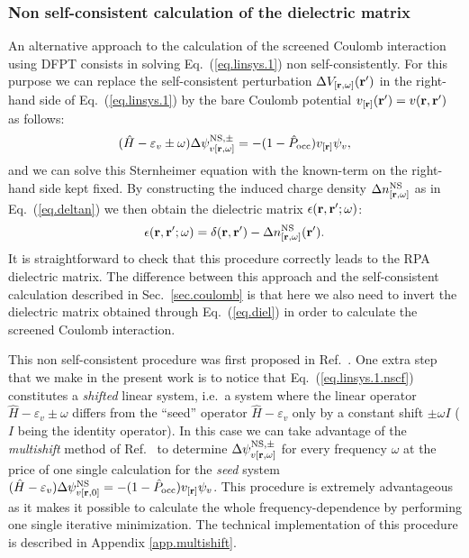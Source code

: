 \documentclass[twocolumn,prb,showpacs,superscriptaddress]{revtex4}
\def\w{\omega}
\def\H{\hat{H}}
\def\P{\hat{P}_{\rm occ}}
\def\E{\varepsilon}
\def\r{{\bf r}}
\def\rp{{\bf r^\prime}}
\begin{document}
\subsubsection{Non self-consistent calculation of the dielectric matrix}\label{sec.diel.nscf}

An alternative approach to the calculation of the screened Coulomb interaction
using DFPT consists in solving Eq.\ (\ref{eq.linsys.1}) non self-consistently.
For this purpose we can replace the self-consistent perturbation $\Delta V_{[\r,\w]}(\rp)$
in the right-hand side of Eq.\ (\ref{eq.linsys.1}) by the bare Coulomb potential
$v_{[\r]}(\rp)=v(\r,\rp)$ as follows:
  \begin{equation}\label{eq.linsys.1.nscf}
  (\H-\E_v\pm\w) \Delta \psi^{{\rm NS},\pm}_{v[\r,\w]}  = -(1-\P)  v_{[\r]} \psi_v, 
  \end{equation}
and we can solve this Sternheimer equation with the known-term on the right-hand side
kept fixed. By constructing the induced charge density $\Delta n^{\rm NS}_{[\r,\w]}$ as in Eq.\ (\ref{eq.deltan})
we then obtain the dielectric matrix $\epsilon(\r,\rp;\w)$:
  \begin{equation}\label{eq.diel}
  \epsilon(\r,\rp;\w) = \delta(\r,\rp) - \Delta n^{\rm NS}_{[\r,\w]}(\rp).
  \end{equation}
It is straightforward to check that this procedure correctly leads to the RPA
dielectric matrix.\cite{hl86-prb}
The difference between this approach and the self-consistent calculation described in
Sec.\ \ref{sec.coulomb} is that here we also need to invert the dielectric matrix obtained
through Eq.\ (\ref{eq.diel}) in order to calculate the screened Coulomb interaction.

This non self-consistent procedure was first proposed in Ref.\ .
One extra step that we make in the present work is to notice that Eq.\ (\ref{eq.linsys.1.nscf})
constitutes a {\it shifted} linear system, i.e.\ a system where the linear operator
$\H-\E_v\pm\w$ differs from the ``seed'' operator $\H-\E_v$ only by a constant shift $\pm\w I$ 
($I$ being the identity operator). 
In this case we can take
advantage of the {\it multishift} method of Ref.\ 
to determine $\Delta \psi^{{\rm NS},\pm}_{v[\r,\w]}$ for every frequency $\w$
at the price of one single calculation for the {\it seed} system $(\H-\E_v) \Delta \psi^{{\rm NS}}_{v[\r,0]}  = -(1-\P)  v_{[\r]} \psi_v$.
This procedure is extremely advantageous as it makes it possible to calculate the whole frequency-dependence 
by performing one single iterative minimization. 
The technical implementation of this procedure is described in Appendix \ref{app.multishift}.
\end{document}
